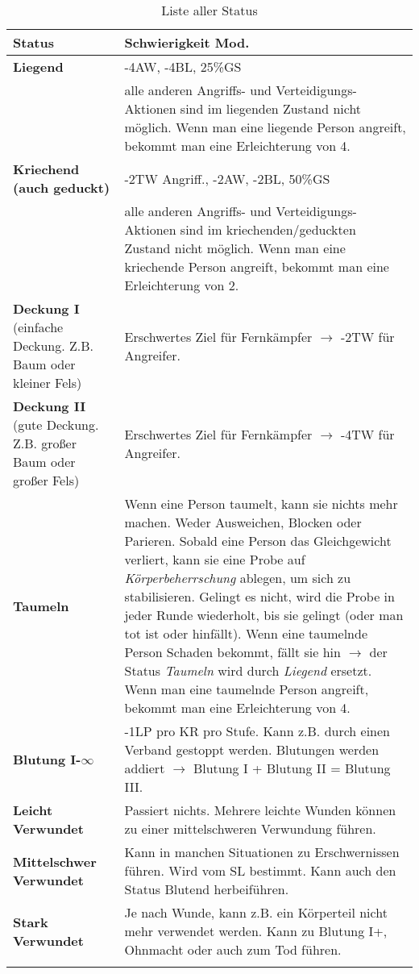 \begin{longtable}{|p{4cm}|p{12cm}|}
\hline
\textbf{Status} & \textbf{Schwierigkeit Mod.} \\

\hline
\textbf{Liegend} & -4AW, -4BL, 25\%GS \\
                 & alle anderen Angriffs- und Verteidigungs-Aktionen sind im liegenden Zustand nicht möglich. Wenn man eine liegende Person angreift, bekommt man eine Erleichterung von 4. \\

\hline
\textbf{Kriechend (auch geduckt)} & -2TW Angriff., -2AW, -2BL, 50\%GS \\
                 & alle anderen Angriffs- und Verteidigungs-Aktionen sind im kriechenden/geduckten Zustand nicht möglich. Wenn man eine kriechende Person angreift, bekommt man eine Erleichterung von 2. \\
      
\hline
\textbf{Deckung I} (einfache Deckung. Z.B. Baum oder kleiner Fels) & Erschwertes Ziel für Fernkämpfer $\rightarrow$ -2TW für Angreifer. \\

\hline
\textbf{Deckung II} (gute Deckung. Z.B. großer Baum oder großer Fels) & Erschwertes Ziel für Fernkämpfer $\rightarrow$ -4TW für Angreifer. \\

\hline
\textbf{Taumeln} & Wenn eine Person taumelt, kann sie nichts mehr machen. Weder Ausweichen, Blocken oder Parieren. Sobald eine Person das Gleichgewicht verliert, kann sie eine Probe auf \textit{Körperbeherrschung} ablegen, um sich zu stabilisieren. Gelingt es nicht, wird die Probe in jeder Runde wiederholt, bis sie gelingt (oder man tot ist oder hinfällt). Wenn eine taumelnde Person Schaden bekommt, fällt sie hin $\rightarrow$ der Status \textit{Taumeln} wird durch \textit{Liegend} ersetzt. Wenn man eine taumelnde Person angreift, bekommt man eine Erleichterung von 4. \\

\hline
\textbf{Blutung I-$\infty$} & -1LP pro KR pro Stufe. Kann z.B. durch einen Verband gestoppt werden. Blutungen werden addiert $\rightarrow$ Blutung I + Blutung II = Blutung III. \\

\hline
\textbf{Leicht Verwundet} & Passiert nichts. Mehrere leichte Wunden können zu einer mittelschweren Verwundung führen. \\

\hline
\textbf{Mittelschwer Verwundet} & Kann in manchen Situationen zu Erschwernissen führen. Wird vom SL bestimmt. Kann auch den Status Blutend herbeiführen. \\

\hline
\textbf{Stark Verwundet} & Je nach Wunde, kann z.B. ein Körperteil nicht mehr verwendet werden. Kann zu Blutung I+, Ohnmacht oder auch zum Tod führen. \\

\hline
\caption{Liste aller Status}
\label{tab:Status}
\end{longtable}

